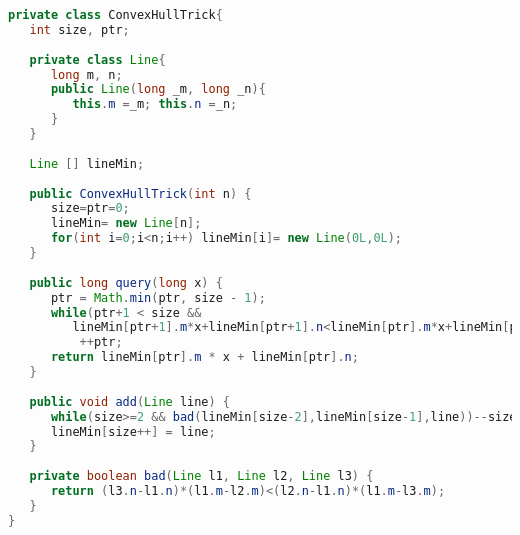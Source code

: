 \begin{lstlisting}[language=Java]
private class ConvexHullTrick{
   int size, ptr;
	
   private class Line{
      long m, n;
      public Line(long _m, long _n){
         this.m =_m; this.n =_n;
      }
   }
	
   Line [] lineMin;
	
   public ConvexHullTrick(int n) {
      size=ptr=0;
      lineMin= new Line[n];
      for(int i=0;i<n;i++) lineMin[i]= new Line(0L,0L);
   }
	
   public long query(long x) {
      ptr = Math.min(ptr, size - 1);
      while(ptr+1 < size && 
         lineMin[ptr+1].m*x+lineMin[ptr+1].n<lineMin[ptr].m*x+lineMin[ptr].n)
          ++ptr;
      return lineMin[ptr].m * x + lineMin[ptr].n;
   }
	
   public void add(Line line) {
      while(size>=2 && bad(lineMin[size-2],lineMin[size-1],line))--size;
      lineMin[size++] = line;
   }
	
   private boolean bad(Line l1, Line l2, Line l3) {
      return (l3.n-l1.n)*(l1.m-l2.m)<(l2.n-l1.n)*(l1.m-l3.m);
   }
}
\end{lstlisting} 




